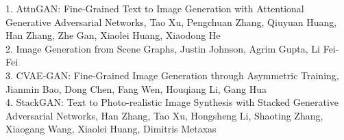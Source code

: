 \documentclass{article}
\begin{document}
      \large 1. AttnGAN: Fine-Grained Text to Image Generation
with Attentional Generative Adversarial Networks,
      Tao Xu, Pengchuan Zhang, Qiuyuan Huang, Han Zhang, Zhe Gan, Xiaolei Huang, Xiaodong He\\
      2. Image Generation from Scene Graphs,
      Justin Johnson, Agrim Gupta, Li Fei-Fei\\
      3. CVAE-GAN: Fine-Grained Image Generation through Asymmetric Training, Jianmin Bao, Dong Chen, Fang Wen, Houqiang Li, Gang Hua\\
      4. StackGAN: Text to Photo-realistic Image Synthesis with Stacked Generative Adversarial Networks, Han Zhang, Tao Xu, Hongsheng Li, Shaoting Zhang, Xiaogang Wang, Xiaolei Huang, Dimitris Metaxas\\
\end{document}
